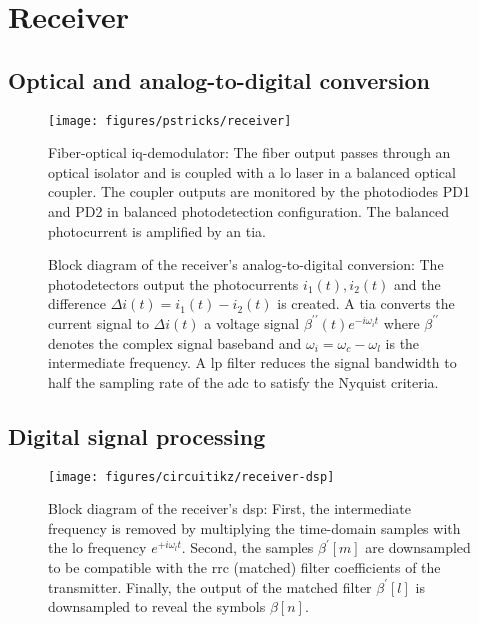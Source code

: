 \section{Receiver}


\subsection{Optical and analog-to-digital conversion}

\begin{figure}[htb]
	\centering
	\texttt{[image: figures/pstricks/receiver]}
	\caption{Fiber-optical \gls{iq}-demodulator: The fiber output passes through an optical isolator and is coupled with a \gls{lo} laser in a balanced optical coupler. The coupler outputs are monitored by the photodiodes PD1 and PD2 in balanced photodetection configuration. The balanced photocurrent is amplified by an \gls{tia}.}
\end{figure}

\begin{figure}[htb]
	\centering
	
	\caption{Block diagram of the receiver's analog-to-digital conversion: The photodetectors output the photocurrents $i_1(t),i_2(t)$ and the difference $\Delta i(t)=i_1(t)-i_2(t)$ is created. A \gls{tia} converts the current signal to $\Delta i(t)$ a voltage signal $\beta^{\prime\prime}(t)e^{-i\omega_it}$ where $\beta^{\prime\prime}$ denotes the complex signal baseband and $\omega_i=\omega_c-\omega_l$ is the intermediate frequency. A \gls{lp} filter reduces the signal bandwidth to half the sampling rate of the \gls{adc} to satisfy the Nyquist criteria.}
\end{figure}

\FloatBarrier
\subsection{Digital signal processing}


\begin{figure}[htb]
	\centering
	\texttt{[image: figures/circuitikz/receiver-dsp]}
	\caption{Block diagram of the receiver's \gls{dsp}: First, the intermediate frequency is removed by multiplying the time-domain samples with the \gls{lo} frequency $e^{+i\omega_lt}$. Second, the samples $\beta^\prime[m]$ are downsampled to be compatible with the \gls{rrc} (matched) filter coefficients of the transmitter. Finally, the output of the matched filter $\beta^\prime[l]$ is downsampled to reveal the symbols $\beta[n]$.}
\end{figure}

